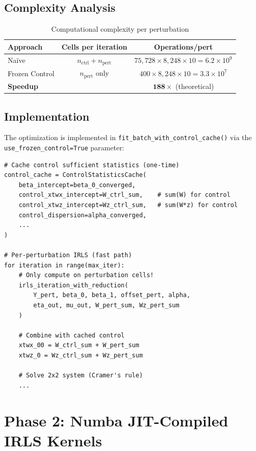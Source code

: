 \documentclass{article}
\begin{document}
\subsection{Complexity Analysis}

\begin{table}[h]
\centering
\caption{Computational complexity per perturbation}
\label{tab:complexity}
\begin{tabular}{lcc}
\toprule
\textbf{Approach} & \textbf{Cells per iteration} & \textbf{Operations/pert} \\
\midrule
Na\"ive & $n_{\text{ctrl}} + n_{\text{pert}}$ & $75{,}728 \times 8{,}248 \times 10 = 6.2 \times 10^9$ \\
Frozen Control & $n_{\text{pert}}$ only & $400 \times 8{,}248 \times 10 = 3.3 \times 10^7$ \\
\midrule
\textbf{Speedup} & & $\mathbf{188\times}$ (theoretical) \\
\bottomrule
\end{tabular}
\end{table}

\subsection{Implementation}

The optimization is implemented in \texttt{fit\_batch\_with\_control\_cache()} via the \texttt{use\_frozen\_control=True} parameter:

\begin{lstlisting}
# Cache control sufficient statistics (one-time)
control_cache = ControlStatisticsCache(
    beta_intercept=beta_0_converged,
    control_xtwx_intercept=W_ctrl_sum,    # sum(W) for control
    control_xtwz_intercept=Wz_ctrl_sum,   # sum(W*z) for control
    control_dispersion=alpha_converged,
    ...
)

# Per-perturbation IRLS (fast path)
for iteration in range(max_iter):
    # Only compute on perturbation cells!
    irls_iteration_with_reduction(
        Y_pert, beta_0, beta_1, offset_pert, alpha,
        eta_out, mu_out, W_pert_sum, Wz_pert_sum
    )
    
    # Combine with cached control
    xtwx_00 = W_ctrl_sum + W_pert_sum
    xtwz_0 = Wz_ctrl_sum + Wz_pert_sum
    
    # Solve 2x2 system (Cramer's rule)
    ...
\end{lstlisting}

\section{Phase 2: Numba JIT-Compiled IRLS Kernels}
\end{document}
